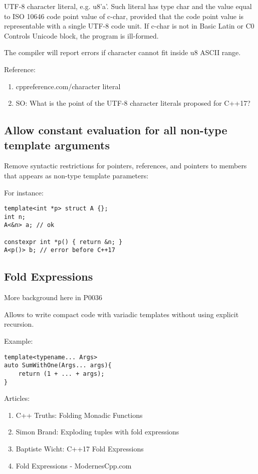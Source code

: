 UTF-8 character literal, e.g. u8'a'. Such literal has type char and the value equal to ISO 10646 code point value of c-char, provided that the code point value is representable with a single UTF-8 code unit. If c-char is not in Basic Latin or C0 Controls Unicode block, the program is ill-formed.

The compiler will report errors if character cannot fit inside u8 ASCII range.

Reference:
\begin{enumerate}
\item cppreference.com/character literal
\item SO: What is the point of the UTF-8 character literals proposed for C++17?
\end{enumerate}

\subsection{Allow constant evaluation for all non-type template arguments}

Remove syntactic restrictions for pointers, references, and pointers to members that appears as non-type template parameters:

For instance:
\begin{verbatim}
template<int *p> struct A {};
int n;
A<&n> a; // ok

constexpr int *p() { return &n; }
A<p()> b; // error before C++17
\end{verbatim}

\subsection{Fold Expressions}

More background here in P0036

Allows to write compact code with variadic templates without using explicit recursion.

Example:

\begin{verbatim}
template<typename... Args>
auto SumWithOne(Args... args){
    return (1 + ... + args);
}
\end{verbatim}

Articles:
\begin{enumerate}
\item C++ Truths: Folding Monadic Functions
\item Simon Brand: Exploding tuples with fold expressions
\item Baptiste Wicht: C++17 Fold Expressions
\item Fold Expressions - ModernesCpp.com
\end{enumerate}

